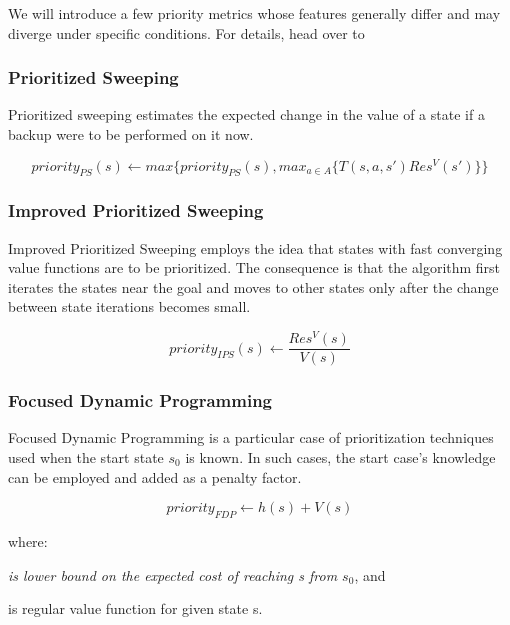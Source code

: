 We will introduce a few priority metrics whose features generally differ and may diverge under specific conditions. For details, head over to \cite{Kolobov2012}


\subsubsection{Prioritized Sweeping} 

Prioritized sweeping estimates the expected change in the value of a state if a backup were to be performed on it now.

\nopagebreak

\begin{equation}priority_{PS} (s) \xleftarrow{} max \Big\{ priority_{PS} (s), max_{a \in A} \big\{ T(s, a, s') Res^{V}(s')\big\} \Big\} \end{equation}


\subsubsection{Improved Prioritized Sweeping}

Improved Prioritized Sweeping employs the idea that states with fast converging value functions are to be prioritized. The consequence is that the algorithm first iterates the states near the goal and moves to other states only after the change between state iterations becomes small.

\nopagebreak

\begin{equation}priority_{IPS} (s) \xleftarrow{} \frac{Res^{V} (s)}{V (s)} \end{equation}

\subsubsection{Focused Dynamic Programming}

Focused Dynamic Programming is a particular case of prioritization techniques used when the start state $s_0$ is known. In such cases, the start case's knowledge can be employed and added as a penalty factor.


\begin{equation}priority_{FDP} \xleftarrow{} h(s) + V(s)\end{equation}


where:
\begin{description}[1cm]
  \item[h(s)] \textit{is lower bound on the expected cost of reaching s from $s_0$}, and
  \item[V(s)] is regular value function for given state s.
\end{description}

